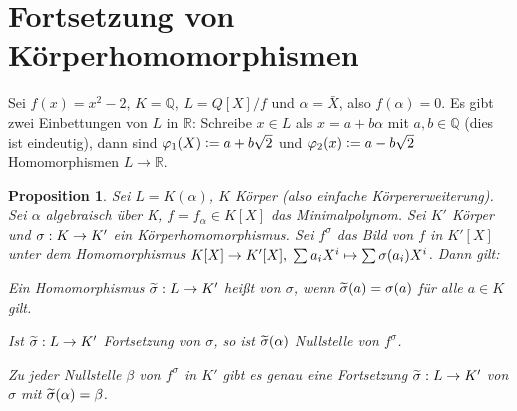 \documentclass[a4paper,10pt,german]{scrbook}
\theoremstyle{saetze}
\theoremstyle{definitionen}
\newtheorem{Prop}[Def]{Proposition}
\begin{document}
\section{Fortsetzung von Körperhomomorphismen}

Sei $f(x)=x^2-2$, $K=\mathbb Q$, $L=Q[X]/f$ und $\alpha=\bar X$, also $f(\alpha)=0$. Es gibt zwei Einbettungen von $L$ in $\mathbb R$: Schreibe $x\in L$ als $x=a + b\alpha$ mit $a,b\in \mathbb Q$ (dies ist eindeutig), dann sind $\varphi_1(X)\mathrel{\mathop:}= a+ b\sqrt 2$ und $\varphi_2(x)\mathrel{\mathop:}= a-b\sqrt 2$ Homomorphismen $L\to \mathbb R$.

\begin{Prop}
\label{3.8}
Sei $L = K(\alpha)$, $K$ Körper (also einfache Körpererweiterung).
Sei $\alpha$ algebraisch über K, $f = f_\alpha \in K[X]$ das Minimalpolynom.
Sei $K'$ Körper und $\sigma: K \rightarrow K'$ ein Körperhomomorphismus. Sei
$f^\sigma$ das Bild von $f$ in $K'[X]$ unter dem Homomorphismus
$K[X] \rightarrow K'[X], \;\sum a_i X^i \mapsto \sum \sigma(a_i) X^i$. Dann
gilt:

\begin{enum}
\item Ein Homomorphismus $\widetilde\sigma:L\to K'$ heißt  von $\sigma$, wenn $\widetilde\sigma(a)=\sigma(a)$ für alle $a\in K$ gilt.
\item Ist $\widetilde{\sigma}: L\rightarrow K'$ Fortsetzung von $\sigma$, so ist $\widetilde{\sigma}(\alpha)$ Nullstelle von $f^\sigma$.
\item Zu jeder Nullstelle $\beta$ von $f^\sigma$ in $K'$ gibt es
genau eine Fortsetzung $\widetilde{\sigma}:L \rightarrow K'$ von $\sigma$ mit
$\widetilde{\sigma}(\alpha) = \beta$.

\end{enum}

\end{Prop}
\end{document}
